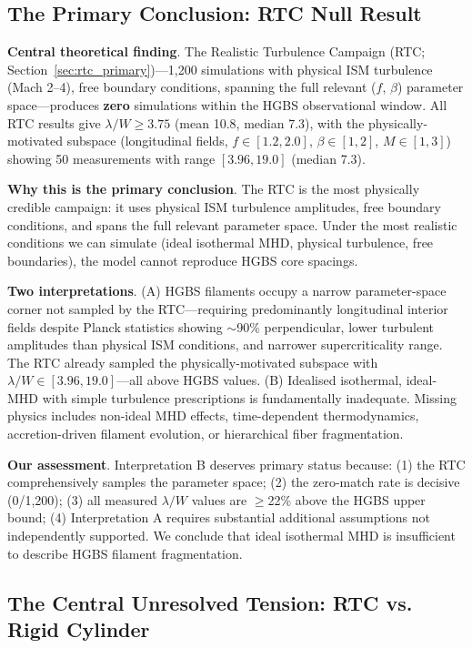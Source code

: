 \documentclass[twocolumn,longtitle,usenatbib]{mnras}
\begin{document}
\subsection{The Primary Conclusion: RTC Null Result}

\textbf{Central theoretical finding}. The Realistic Turbulence Campaign (RTC; Section~\ref{sec:rtc_primary})---1,200 simulations with physical ISM turbulence (Mach 2--4), free boundary conditions, spanning the full relevant ($f$, $\beta$) parameter space---produces \textbf{zero} simulations within the HGBS observational window. All RTC results give $\lambda/W \geq 3.75$ (mean 10.8, median 7.3), with the physically-motivated subspace (longitudinal fields, $f \in [1.2, 2.0]$, $\beta \in [1, 2]$, $M \in [1, 3]$) showing 50 measurements with range $[3.96, 19.0]$ (median 7.3).

\textbf{Why this is the primary conclusion}. The RTC is the most physically credible campaign: it uses physical ISM turbulence amplitudes, free boundary conditions, and spans the full relevant parameter space. Under the most realistic conditions we can simulate (ideal isothermal MHD, physical turbulence, free boundaries), the model cannot reproduce HGBS core spacings.

\textbf{Two interpretations}. (A) HGBS filaments occupy a narrow parameter-space corner not sampled by the RTC---requiring predominantly longitudinal interior fields despite Planck statistics showing $\sim$90\% perpendicular, lower turbulent amplitudes than physical ISM conditions, and narrower supercriticality range. The RTC already sampled the physically-motivated subspace with $\lambda/W \in [3.96, 19.0]$---all above HGBS values. (B) Idealised isothermal, ideal-MHD with simple turbulence prescriptions is fundamentally inadequate. Missing physics includes non-ideal MHD effects, time-dependent thermodynamics, accretion-driven filament evolution, or hierarchical fiber fragmentation.

\textbf{Our assessment}. Interpretation B deserves primary status because: (1) the RTC comprehensively samples the parameter space; (2) the zero-match rate is decisive (0/1,200); (3) all measured $\lambda/W$ values are $\geq$22\% above the HGBS upper bound; (4) Interpretation A requires substantial additional assumptions not independently supported. We conclude that ideal isothermal MHD is insufficient to describe HGBS filament fragmentation.

\subsection{The Central Unresolved Tension: RTC vs. Rigid Cylinder}
\end{document}
